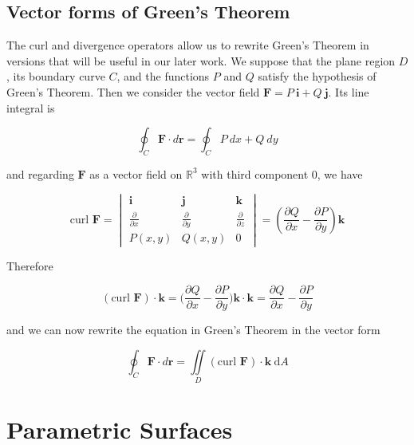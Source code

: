 \documentclass{article}
\begin{document}
\subsection{Vector forms of Green's Theorem}

The curl and divergence operators allow us to rewrite Green's Theorem in versions that will be useful in our later work. We suppose that the plane region $D$, its boundary curve $C$, and the functions $P$ and $Q$ satisfy the hypothesis of Green's Theorem. Then we consider the vector field $\mathbf{F} = P \ \mathbf{i} + Q \ \mathbf{j}$. Its line integral is 

\begin{equation*}
    \oint_C \mathbf{F} \cdot d \mathbf{r} = \oint_C P \ dx + Q \ dy
\end{equation*}

and regarding $\mathbf{F}$ as a vector field on $\mathbb{R}^3$ with third component 0, we have 

\begin{equation*}
    \text{curl } \mathbf{F} = \begin{vmatrix}
        \mathbf{i} & \mathbf{j} & \mathbf{k} \\[6pt]
        \frac{\partial }{\partial x} & \frac{\partial}{\partial y} & \frac{\partial}{\partial z} \\[6pt] 
        P(x,y) & Q(x,y) & 0
    \end{vmatrix} = (\frac{\partial Q}{\partial x} - \frac{\partial P}{\partial y}) \mathbf{k}
\end{equation*}

Therefore

\begin{equation*}
    (\text{curl } \mathbf{F}) \cdot \mathbf{k} = \bigg( \frac{\partial Q}{\partial x} - \frac{\partial P}{\partial y} \bigg) \mathbf{k} \cdot \mathbf{k} = \frac{\partial Q}{\partial x} - \frac{\partial P}{\partial y}
\end{equation*}

and we can now rewrite the equation in Green's Theorem in the vector form 

\begin{equation*}
    \oint_C \mathbf{F} \cdot d \mathbf{r} = \iint\limits_D (\text{curl } \mathbf{F}) \cdot \mathbf{k} \ \mathrm{d} A
\end{equation*}

\newpage
\section{Parametric Surfaces}
\end{document}
